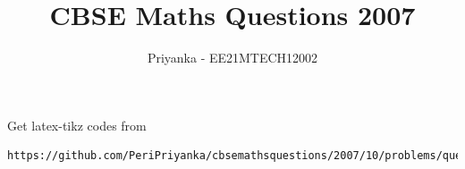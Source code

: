 \documentclass[journal,12pt,twocolumn]{IEEEtran}
\DeclareMathOperator*{\Res}{Res}
\begin{document}
\newtheorem{theorem}{Theorem}[section]
\newtheorem{problem}{Problem}
\newtheorem{proposition}{Proposition}[section]
\newtheorem{lemma}{Lemma}[section]
\newtheorem{corollary}[theorem]{Corollary}
\newtheorem{example}{Example}[section]
\newtheorem{definition}[problem]{Definition}
\newcommand{\BEQA}{\begin{eqnarray}}
\newcommand{\EEQA}{\end{eqnarray}}
\newcommand{\define}{\stackrel{\triangle}{=}}

\providecommand{\mbf}{\mathbf}
\providecommand{\pr}[1]{\ensuremath{\Pr\left(#1\right)}}
\providecommand{\qfunc}[1]{\ensuremath{Q\left(#1\right)}}
\providecommand{\sbrak}[1]{\ensuremath{{}\left[#1\right]}}
\providecommand{\lsbrak}[1]{\ensuremath{{}\left[#1\right.}}
\providecommand{\rsbrak}[1]{\ensuremath{{}\left.#1\right]}}
\providecommand{\brak}[1]{\ensuremath{\left(#1\right)}}
\providecommand{\lbrak}[1]{\ensuremath{\left(#1\right.}}
\providecommand{\rbrak}[1]{\ensuremath{\left.#1\right)}}
\providecommand{\cbrak}[1]{\ensuremath{\left\{#1\right\}}}
\providecommand{\lcbrak}[1]{\ensuremath{\left\{#1\right.}}
\providecommand{\rcbrak}[1]{\ensuremath{\left.#1\right\}}}
\theoremstyle{remark}
\newtheorem{rem}{Remark}
\newcommand{\sgn}{\mathop{\mathrm{sgn}}}
\providecommand{\abs}[1]{\left\vert#1\right\vert}
\providecommand{\res}[1]{\Res\displaylimits_{#1}} 
\providecommand{\norm}[1]{\left\lVert#1\right\rVert}
\providecommand{\mtx}[1]{\mathbf{#1}}
\providecommand{\mean}[1]{E\left[ #1 \right]}
\providecommand{\fourier}{\overset{\mathcal{F}}{ \rightleftharpoons}}
\providecommand{\system}{\overset{\mathcal{H}}{ \longleftrightarrow}}
\newcommand{\solution}{\noindent \textbf{Solution: }}
\newcommand{\cosec}{\,\text{cosec}\,}
\providecommand{\dec}[2]{\ensuremath{\overset{#1}{\underset{#2}{\gtrless}}}}
\newcommand{\myvec}[1]{\ensuremath{\begin{pmatrix}#1\end{pmatrix}}}
\newcommand{\mydet}[1]{\ensuremath{\begin{vmatrix}#1\end{vmatrix}}}
\makeatletter
{}
\makeatother
\let\StandardTheFigure\thefigure
\let\vec\mathbf
\renewcommand{\thefigure}{\theproblem}
\def\putbox#1#2#3{\makebox[0in][l]{\makebox[#1][l]{}\raisebox{\baselineskip}[0in][0in]{\raisebox{#2}[0in][0in]{#3}}}}
     \def\rightbox#1{\makebox[0in][r]{#1}}
     \def\centbox#1{\makebox[0in]{#1}}
     \def\topbox#1{\raisebox{-\baselineskip}[0in][0in]{#1}}
     \def\midbox#1{\raisebox{-0.5\baselineskip}[0in][0in]{#1}}
\vspace{3cm}
\title{CBSE Maths Questions 2007}
\author{Priyanka - EE21MTECH12002}
\maketitle
\newpage
\bigskip
\renewcommand{\thefigure}{\theenumi}
\renewcommand{\thetable}{\theenumi}
%
Get latex-tikz codes from 
%
\begin{lstlisting}
https://github.com/PeriPriyanka/cbsemathsquestions/2007/10/problems/questions
\end{lstlisting}
\end{document}
